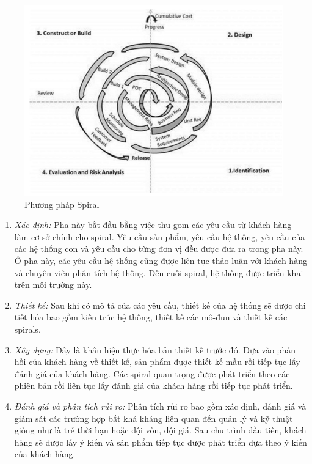 \documentclass{article}
\begin{document}
\begin{figure}[h]
	\centering
	\includegraphics[scale=0.3]{figures/spiral.png}
	\caption{Phương pháp Spiral \cite{tutorialspointsp}}
	\label{fig:spiral}
\end{figure}


\begin{enumerate}
	\item \textit{Xác định:} Pha này bắt đầu bằng việc thu gom các yêu cầu từ khách hàng làm cơ sở chính cho spiral. Yêu cầu sản phẩm, yêu cầu hệ thống, yêu cầu của các hệ thống con và yêu cầu cho từng đơn vị đều được đưa ra trong pha này. Ở pha này, các yêu cầu hệ thống cũng được liên tục thảo luận với khách hàng và chuyên viên phân tích hệ thống. Đến cuối spiral, hệ thống được triển khai trên môi trường này. 
	
	\item \textit{Thiết kế:}  Sau khi có mô tả của các yêu cầu, thiết kế của hệ thống sẽ được chi tiết hóa bao gồm kiến trúc hệ thống, thiết kế các mô-đun và thiết kế các spirals.
	
	\item \textit{Xây dựng:} Đây là khâu hiện thực hóa bản thiết kế trước đó. Dựa vào phản hồi của khách hàng về thiết kế, sản phẩm được thiết kế mẫu rồi tiếp tục lấy đánh giá của khách hàng. Các spiral quan trọng được phát triển theo các phiên bản rồi liên tục lấy đánh giá của khách hàng rồi tiếp tục phát triển. 
	
	\item \textit{Đánh giá và phân tích rủi ro:} Phân tích rủi ro bao gồm xác định, đánh giá và giám sát các trường hợp bất khả kháng liên quan đến quản lý và kỹ thuật giống như là trễ thời hạn hoặc đội vốn, đội giá. Sau chu trình đầu tiên, khách hàng sẽ được lấy ý kiến và sản phẩm tiếp tục được phát triển dựa theo ý kiến của khách hàng. 
	\end{enumerate} 
\end{document}
